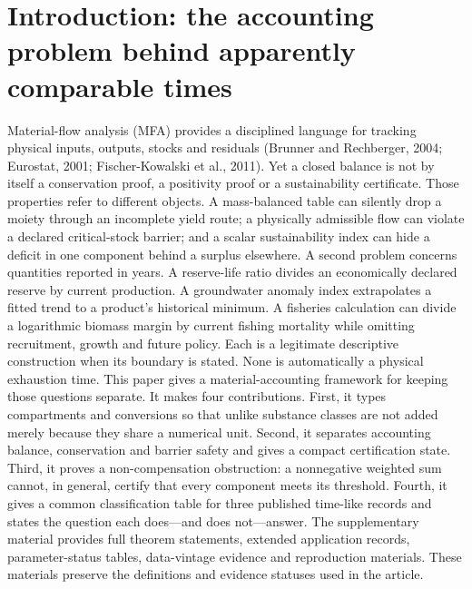 \documentclass[11pt]{article}
\begin{document}
\section{Introduction: the accounting problem behind apparently comparable times}
Material-flow analysis (MFA) provides a disciplined language for tracking physical inputs, outputs, stocks and residuals (Brunner and Rechberger, 2004; Eurostat, 2001; Fischer-Kowalski et al., 2011). Yet a closed balance is not by itself a conservation proof, a positivity proof or a sustainability certificate. Those properties refer to different objects. A mass-balanced table can silently drop a moiety through an incomplete yield route; a physically admissible flow can violate a declared critical-stock barrier; and a scalar sustainability index can hide a deficit in one component behind a surplus elsewhere.
A second problem concerns quantities reported in years. A reserve-life ratio divides an economically declared reserve by current production. A groundwater anomaly index extrapolates a fitted trend to a product's historical minimum. A fisheries calculation can divide a logarithmic biomass margin by current fishing mortality while omitting recruitment, growth and future policy. Each is a legitimate descriptive construction when its boundary is stated. None is automatically a physical exhaustion time.
This paper gives a material-accounting framework for keeping those questions separate. It makes four contributions. First, it types compartments and conversions so that unlike substance classes are not added merely because they share a numerical unit. Second, it separates accounting balance, conservation and barrier safety and gives a compact certification state. Third, it proves a non-compensation obstruction: a nonnegative weighted sum cannot, in general, certify that every component meets its threshold. Fourth, it gives a common classification table for three published time-like records and states the question each does---and does not---answer.
The supplementary material provides full theorem statements, extended application records, parameter-status tables, data-vintage evidence and reproduction materials. These materials preserve the definitions and evidence statuses used in the article.
\end{document}
